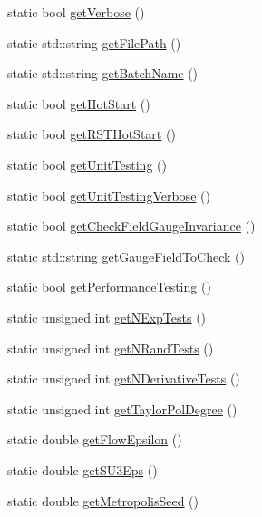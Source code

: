 \begin{DoxyCompactItemize}
static bool \mbox{\hyperlink{class_parameters_a07453f20719f54f9fd6f72d311638b39}{get\+Verbose}} ()
\item 
static std\+::string \mbox{\hyperlink{class_parameters_abace4edb8ece38841b58c5ce6168cbc4}{get\+File\+Path}} ()
\item 
static std\+::string \mbox{\hyperlink{class_parameters_a181a773d23fdb19d0c4f35e6cf2d5649}{get\+Batch\+Name}} ()
\item 
static bool \mbox{\hyperlink{class_parameters_a5ba21c056f0b7da17abcdd0a1eb2061f}{get\+Hot\+Start}} ()
\item 
static bool \mbox{\hyperlink{class_parameters_a4c24cb57765589a12eae030894423735}{get\+R\+S\+T\+Hot\+Start}} ()
\item 
static bool \mbox{\hyperlink{class_parameters_a785042104e5f47f11d625ec346853174}{get\+Unit\+Testing}} ()
\item 
static bool \mbox{\hyperlink{class_parameters_a2645617063e170828a3da439094ab626}{get\+Unit\+Testing\+Verbose}} ()
\item 
static bool \mbox{\hyperlink{class_parameters_a2563b9474acd87cf4a350f488c71339f}{get\+Check\+Field\+Gauge\+Invariance}} ()
\item 
static std\+::string \mbox{\hyperlink{class_parameters_ad6dea2bb6e91a1ca4fb5e20216b40039}{get\+Gauge\+Field\+To\+Check}} ()
\item 
static bool \mbox{\hyperlink{class_parameters_a778a2311c27854392c34c15bd4ea19f8}{get\+Performance\+Testing}} ()
\item 
static unsigned int \mbox{\hyperlink{class_parameters_abd70d1df3ee0109789496fc9d21c2aef}{get\+N\+Exp\+Tests}} ()
\item 
static unsigned int \mbox{\hyperlink{class_parameters_a492a81a7a0951b1165f500f8c0768fe1}{get\+N\+Rand\+Tests}} ()
\item 
static unsigned int \mbox{\hyperlink{class_parameters_a24545a7987ec3056a6c0ad742edd9ba5}{get\+N\+Derivative\+Tests}} ()
\item 
static unsigned int \mbox{\hyperlink{class_parameters_a272f8ebfbd305fb4a3b03db68417fc90}{get\+Taylor\+Pol\+Degree}} ()
\item 
static double \mbox{\hyperlink{class_parameters_a96dbafc27f287de83dfaec3bc2d45efe}{get\+Flow\+Epsilon}} ()
\item 
static double \mbox{\hyperlink{class_parameters_ac14d1b11099fdfa254fb138d4471ceb2}{get\+S\+U3\+Eps}} ()
\item 
static double \mbox{\hyperlink{class_parameters_ae63389dad9d4564f4849137d2ab37df5}{get\+Metropolis\+Seed}} ()

\end{DoxyCompactItemize}
